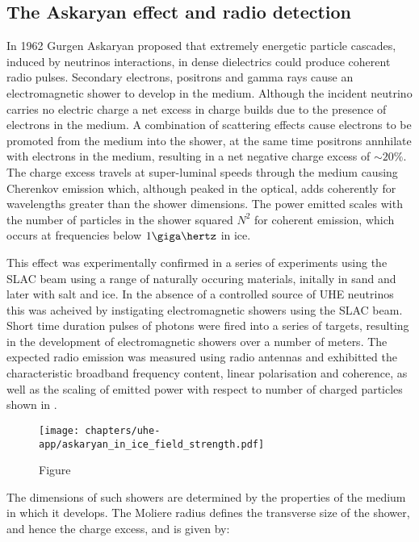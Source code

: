 \subsection{The Askaryan effect and radio detection}
\label{sec:uhe-app:UHEN:Askaryan}

In 1962 Gurgen Askaryan proposed that extremely energetic particle cascades, induced by neutrinos interactions, in dense dielectrics could produce coherent radio pulses. Secondary electrons, positrons and gamma rays cause an electromagnetic shower to develop in the medium. Although the incident neutrino carries no electric charge a net excess in charge builds due to the presence of electrons in the medium. A combination of scattering effects cause electrons to be promoted from the medium into the shower, at the same time positrons annhilate with electrons in the medium, resulting in a net negative charge excess of $\sim 20\%$. The charge excess travels at super-luminal speeds through the medium causing Cherenkov emission which, although peaked in the optical, adds coherently for wavelengths greater than the shower dimensions. The power emitted scales with the number of particles in the shower squared $N^{2}$ for coherent emission, which occurs at frequencies below $1\giga \hertz$ in ice. 

This effect was experimentally confirmed in a series of experiments using the SLAC beam using a range of naturally occuring materials, initally in sand and later with salt and ice. In the absence of a controlled source of UHE neutrinos this was acheived by instigating electromagnetic showers using the SLAC beam. Short time duration pulses of \GeV photons were fired into a series of targets, resulting in the development of electromagnetic showers over a number of meters. The expected radio emission was measured using radio antennas and exhibitted the characteristic broadband frequency content, linear polarisation and coherence, as well as the scaling of emitted power with respect to number of charged particles  shown in .


\begin{figure}[htpb]
  \centering
  \texttt{[image: chapters/uhe-app/askaryan\_in\_ice\_field\_strength.pdf]}
  \caption{Figure}
  \label{fig:uhe-app:UHEN:Askaryan:Askaryan_in_ice}
\end{figure}

The dimensions of such showers are determined by the properties of the medium in which it develops. The Moliere radius defines the transverse size of the shower, and hence the charge excess, and is given by:

